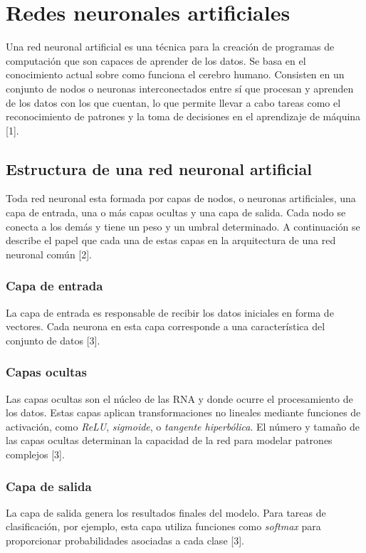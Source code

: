 
\section{Redes neuronales artificiales}

Una red neuronal artificial es una técnica para la creación de programas de computación que son capaces de aprender de los datos. Se basa en el conocimiento actual sobre como funciona el cerebro humano. 
Consisten en un conjunto de nodos o neuronas interconectados entre sí que procesan y aprenden de los datos con los que cuentan, lo que permite llevar a cabo tareas como el reconocimiento de patrones y la toma de decisiones en el aprendizaje de máquina [1].


\subsection{Estructura de una red neuronal artificial}
Toda red neuronal esta formada por capas de nodos, o neuronas artificiales, una capa de entrada, una o más capas ocultas y una capa de salida. Cada nodo se conecta a los demás y tiene un peso y un umbral determinado.
A continuación se describe el papel que cada una de estas capas en la arquitectura de una red neuronal común [2].

\subsubsection{Capa de entrada}
La capa de entrada es responsable de recibir los datos iniciales en forma de vectores. Cada neurona en esta capa corresponde a una característica del conjunto de datos [3].

\subsubsection{Capas ocultas}
Las capas ocultas son el núcleo de las RNA y donde ocurre el procesamiento de los datos. Estas capas aplican transformaciones no lineales mediante funciones de activación, como \textit{ReLU}, \textit{sigmoide}, o \textit{tangente hiperbólica}. El número y tamaño de las capas ocultas determinan la capacidad de la red para modelar patrones complejos [3].

\subsubsection{Capa de salida}
La capa de salida genera los resultados finales del modelo. Para tareas de clasificación, por ejemplo, esta capa utiliza funciones como \textit{softmax} para proporcionar probabilidades asociadas a cada clase [3].

